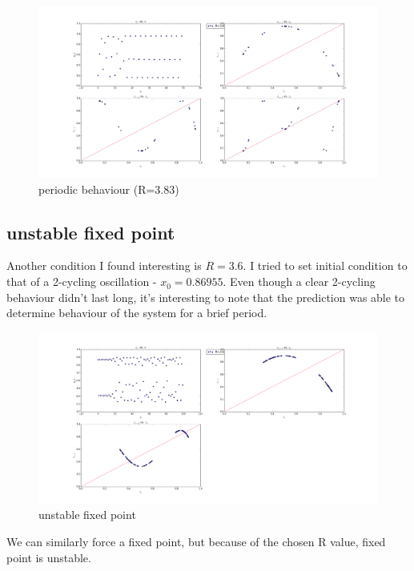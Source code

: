 \documentclass[12pt]{article}\pagestyle{myheadings}
\theoremstyle{plain}
\begin{document}
	
\begin{figure}[h!]
\centering
\includegraphics[scale=.3]{3,83.png}
\caption{periodic behaviour (R=3.83)}
\label{fig:my_label}
\end{figure}

	
\clearpage
\subsection{unstable fixed point}
Another condition I found interesting is $R=3.6$. I tried to set initial condition to that of a 2-cycling oscillation - $x_0 =0.86955$. Even though a clear 2-cycling behaviour didn't last long, it's interesting to note that the prediction was able to determine behaviour of the system for a brief period. 

\begin{figure}[h!]
\centering
\includegraphics[scale=.2]{3,6.png}
\caption{unstable fixed point}
\label{fig:my_label}
\end{figure}

We can similarly force a fixed point, but because of the chosen R value, fixed point is unstable. 
\end{document}
